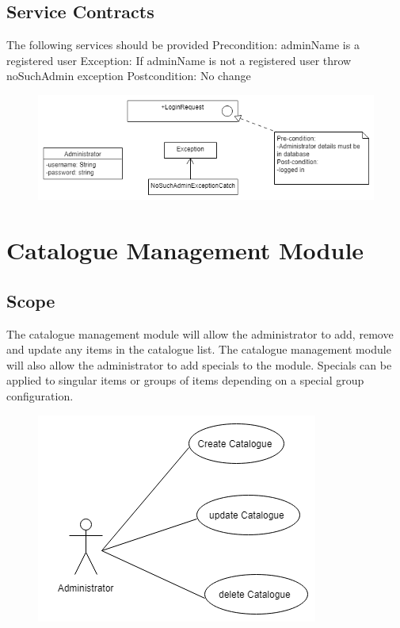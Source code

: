 \documentclass[12pt]{article}
\begin{document}
\subsection{Service Contracts}
The following services should be provided
Precondition: adminName is a registered user
Exception: If adminName is not a registered user throw \\noSuchAdmin exception
Postcondition: No change
\begin{figure}[h]
\centering
\includegraphics[scale=0.7]{diagrams/useS.png}
\end{figure}
\section{Catalogue Management Module}
\subsection{Scope}
The catalogue management module will allow the administrator to add, remove and update any items in the catalogue list.
The catalogue management module will also allow the  administrator to add specials to the module. Specials can be applied to singular items or groups of items depending on a special group configuration.
\begin{figure}[h]
\centering
\includegraphics[scale=0.575]{diagrams/notS.png}
\end{figure}
\newpage
\end{document}
